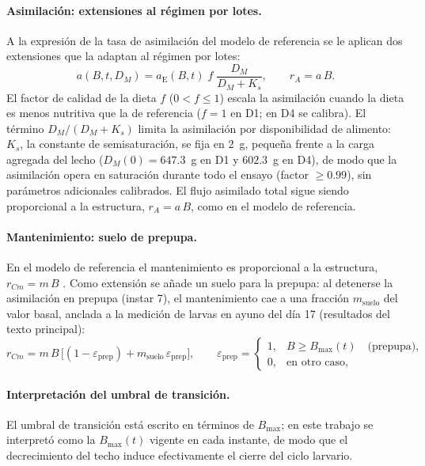 \documentclass[11pt,a4paper]{article}
\begin{document}
\paragraph{Asimilación: extensiones al régimen por lotes.}
A la expresión de la tasa de asimilación del modelo de referencia se le aplican dos extensiones que la adaptan al régimen por lotes:
\begin{equation}
a(B, t, D_M) = a_{\mathrm{E}}(B, t)\; f\; \frac{D_M}{D_M + K_s},
\qquad r_A = a\,B.
\label{eq:asimilacion}
\end{equation}
El factor de calidad de la dieta $f$ ($0 < f \le 1$) escala la asimilación cuando la dieta es menos nutritiva que la de referencia ($f = 1$ en D1; en D4 se calibra). El término $D_M/(D_M + K_s)$ limita la asimilación por disponibilidad de alimento: $K_s$, la constante de semisaturación, se fija en 2~g, pequeña frente a la carga agregada del lecho ($D_M(0) = 647.3$~g en D1 y $602.3$~g en D4), de modo que la asimilación opera en saturación durante todo el ensayo (factor $\geq 0.99$), sin parámetros adicionales calibrados. El flujo asimilado total sigue siendo proporcional a la estructura, $r_A = a\,B$, como en el modelo de referencia.

\paragraph{Mantenimiento: suelo de prepupa.}
En el modelo de referencia el mantenimiento es proporcional a la estructura, $r_{Cm} = m\,B$ \parencite{eriksenDynamicModellingFeed2022}. Como extensión se añade un suelo para la prepupa: al detenerse la asimilación en prepupa (instar 7), el mantenimiento cae a una fracción $m_{\mathrm{suelo}}$ del valor basal, anclada a la medición de larvas en ayuno del día 17 (resultados del texto principal):
\begin{equation}
r_{Cm} = m\,B\,\big[(1 - \varepsilon_{\mathrm{prep}}) + m_{\mathrm{suelo}}\,\varepsilon_{\mathrm{prep}}\big],
\qquad
\varepsilon_{\mathrm{prep}} =
\begin{cases}
1, & B \ge B_{\max}(t) \quad \text{(prepupa)},\\
0, & \text{en otro caso},
\end{cases}
\label{eq:mantenimiento}
\end{equation}

\paragraph{Interpretación del umbral de transición.}
El umbral de transición está escrito en términos de $B_{\max}$; en este trabajo se interpretó como la $B_{\max}(t)$ vigente en cada instante, de modo que el decrecimiento del techo induce efectivamente el cierre del ciclo larvario.
\end{document}
